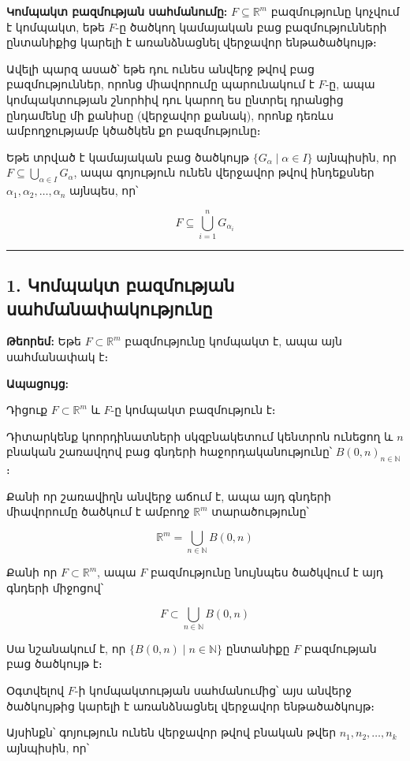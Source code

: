 \documentclass[12pt, a4paper]{article}
\begin{document}
\textbf{Կոմպակտ բազմության սահմանումը:}
$F \subseteq \mathbb{R}^m$ բազմությունը կոչվում է կոմպակտ, եթե $F$-ը ծածկող կամայական բաց բազմությունների ընտանիքից կարելի է առանձնացնել վերջավոր ենթածածկույթ։

Ավելի պարզ ասած՝ եթե դու ունես անվերջ թվով բաց բազմություններ, որոնց միավորումը պարունակում է $F$-ը, ապա կոմպակտության շնորհիվ դու կարող ես ընտրել դրանցից ընդամենը մի քանիսը (վերջավոր քանակ), որոնք դեռևս ամբողջությամբ կծածկեն քո բազմությունը։

Եթե տրված է կամայական բաց ծածկույթ $\{G_\alpha \mid \alpha \in I\}$ այնպիսին, որ $F \subseteq \bigcup_{\alpha \in I} G_\alpha$, ապա գոյություն ունեն վերջավոր թվով ինդեքսներ $\alpha_1, \alpha_2, \dots, \alpha_n$ այնպես, որ՝

$$F \subseteq \bigcup_{i=1}^{n} G_{\alpha_i}$$

\vspace{1em}
\hrule
\vspace{1em}

\subsection{1. Կոմպակտ բազմության սահմանափակությունը}

\textbf{Թեորեմ:} Եթե $F \subset \mathbb{R}^m$ բազմությունը կոմպակտ է, ապա այն սահմանափակ է։

\textbf{Ապացույց:}

Դիցուք $F \subset \mathbb{R}^m$ և $F$-ը կոմպակտ բազմություն է։

Դիտարկենք կոորդինատների սկզբնակետում կենտրոն ունեցող և $n$ բնական շառավղով բաց գնդերի հաջորդականությունը՝ $B(0, n)_{n \in \mathbb{N}}$։

Քանի որ շառավիղն անվերջ աճում է, ապա այդ գնդերի միավորումը ծածկում է ամբողջ $\mathbb{R}^m$ տարածությունը՝

$$\mathbb{R}^m = \bigcup_{n \in \mathbb{N}} B(0, n)$$

Քանի որ $F \subset \mathbb{R}^m$, ապա $F$ բազմությունը նույնպես ծածկվում է այդ գնդերի միջոցով՝

$$F \subset \bigcup_{n \in \mathbb{N}} B(0, n)$$

Սա նշանակում է, որ $\{B(0, n) \mid n \in \mathbb{N}\}$ ընտանիքը $F$ բազմության բաց ծածկույթ է։

Օգտվելով $F$-ի կոմպակտության սահմանումից՝ այս անվերջ ծածկույթից կարելի է առանձնացնել վերջավոր ենթածածկույթ։

Այսինքն՝ գոյություն ունեն վերջավոր թվով բնական թվեր $n_1, n_2, \dots, n_k$ այնպիսին, որ՝
\end{document}
